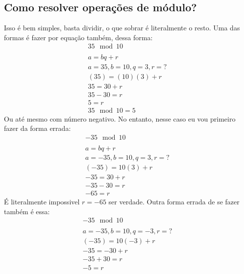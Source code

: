 \documentclass[12pt]{article}
\begin{document}
    \subsection{Como resolver operações de módulo?}
    Isso é bem simples, basta dividir, o que sobrar é literalmente o resto. Uma das formas é fazer por equação também, dessa forma:
    \begin{equation}
        \begin{split}
            35 \mod 10\\\\
            a = bq+r\\
            a = 35, b = 10, q=3, r = ?\\
            (35) = (10)(3) + r\\
            35 = 30 + r\\
            35 - 30 = r\\
            5 = r\\
            35 \mod 10 = 5
        \end{split}
    \end{equation}
    Ou até mesmo com número negativo. No entanto, nesse caso eu vou primeiro fazer da forma errada:
    \begin{equation}
        \begin{split}
            -35 \mod 10\\\\
            a = bq+r\\
            a = -35, b = 10, q = 3, r = ?\\
            (-35) = 10(3) + r\\
            -35 = 30 + r\\
            -35 - 30 = r\\
            -65 = r
        \end{split}
    \end{equation}
    É literalmente impossivel $r = -65$ ser verdade. Outra forma errada de se fazer também é essa:
    \begin{equation}
        \begin{split}
           -35 \mod 10 \\\\
           a = -35, b=10, q=-3, r = ?\\
           (-35) = 10(-3)+r\\
           -35 = -30 +r\\
           -35+30 = r\\
           -5 = r
        \end{split}
    \end{equation}
\end{document}
